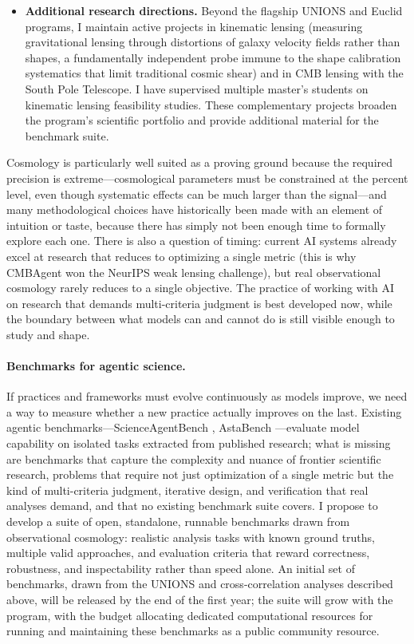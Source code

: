 \documentclass[11pt, a4paper]{article}
\begin{document}
\begin{itemize}
As a legacy product, I will also produce CMB lensing maps of the Euclid deep fields, released publicly and useful for years as these fields grow deeper with successive data releases.
\item \textbf{Additional research directions.}
Beyond the flagship UNIONS and Euclid programs, I maintain active projects in kinematic lensing (measuring gravitational lensing through distortions of galaxy velocity fields rather than shapes, a fundamentally independent probe immune to the shape calibration systematics that limit traditional cosmic shear) and in CMB lensing with the South Pole Telescope.
I have supervised multiple master's students on kinematic lensing feasibility studies.
These complementary projects broaden the program's scientific portfolio and provide additional material for the benchmark suite.
\end{itemize}
Cosmology is particularly well suited as a proving ground because the required precision is extreme---cosmological parameters must be constrained at the percent level, even though systematic effects can be much larger than the signal---and many methodological choices have historically been made with an element of intuition or taste, because there has simply not been enough time to formally explore each one.
There is also a question of timing: current AI systems already excel at research that reduces to optimizing a single metric (this is why CMBAgent won the NeurIPS weak lensing challenge), but real observational cosmology rarely reduces to a single objective.
The practice of working with AI on research that demands multi-criteria judgment is best developed now, while the boundary between what models can and cannot do is still visible enough to study and shape.

\paragraph{Benchmarks for agentic science.}
If practices and frameworks must evolve continuously as models improve, we need a way to measure whether a new practice actually improves on the last.
Existing agentic benchmarks---ScienceAgentBench \citep{chen.etal24}, AstaBench \citep{bragg.etal25}---evaluate model capability on isolated tasks extracted from published research; what is missing are benchmarks that capture the complexity and nuance of frontier scientific research, problems that require not just optimization of a single metric but the kind of multi-criteria judgment, iterative design, and verification that real analyses demand, and that no existing benchmark suite covers.
I propose to develop a suite of open, standalone, runnable benchmarks drawn from observational cosmology: realistic analysis tasks with known ground truths, multiple valid approaches, and evaluation criteria that reward correctness, robustness, and inspectability rather than speed alone.
An initial set of benchmarks, drawn from the UNIONS and cross-correlation analyses described above, will be released by the end of the first year; the suite will grow with the program, with the budget allocating dedicated computational resources for running and maintaining these benchmarks as a public community resource.
\end{document}

